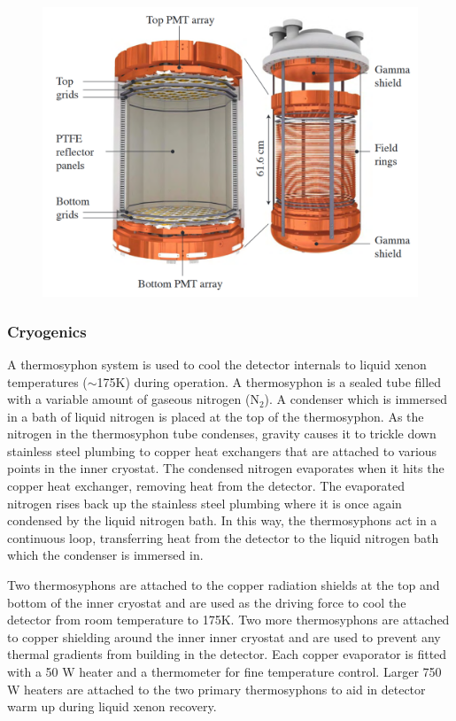 \documentclass[a4paper,12pt]{article}
\begin{document}
 \begin{figure} [!h]
\includegraphics[scale=.45]{LuxFieldCage.png} 
\label{LuxFieldCage}
\end{figure}


\subsubsection{Cryogenics}

A thermosyphon system is used to cool the detector internals to liquid xenon temperatures  ($\sim$175K) during operation. A thermosyphon is a sealed tube filled with a variable amount of gaseous nitrogen (N$_2$).  A condenser which is immersed in a bath of liquid nitrogen is placed at the top of the thermosyphon.  As the nitrogen in the thermosyphon tube condenses, gravity causes it to trickle down stainless steel plumbing to copper heat exchangers that are attached to various points in the inner cryostat.  The condensed nitrogen evaporates when it hits the copper heat exchanger, removing heat from the detector.  The evaporated nitrogen rises back up the stainless steel plumbing where it is once again condensed by the liquid nitrogen bath.  In this way, the thermosyphons act in a continuous loop, transferring heat from the detector to the liquid nitrogen bath which the condenser is immersed in.

Two thermosyphons are attached to the copper radiation shields at the top and bottom of the inner cryostat and are used as the driving force to cool the detector from room temperature to 175K. Two more thermosyphons are attached to copper shielding around the inner inner cryostat and are used to prevent any thermal gradients from building in the detector.  Each copper evaporator is fitted with a 50 W heater and a thermometer for fine temperature control.  Larger 750 W heaters are attached to the two primary thermosyphons to aid in detector warm up during liquid xenon recovery.
\end{document}
